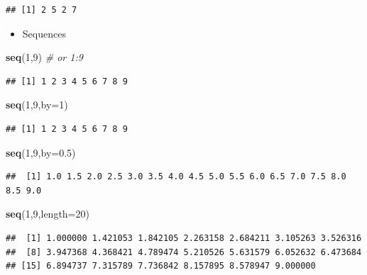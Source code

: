 \documentclass[]{article}
\def\tightlist{}
\newenvironment{Shaded}{\begin{snugshade}}{\end{snugshade}}
\newcommand{\KeywordTok}[1]{\textcolor[rgb]{0.13,0.29,0.53}{\textbf{{#1}}}}
\newcommand{\DataTypeTok}[1]{\textcolor[rgb]{0.13,0.29,0.53}{{#1}}}
\newcommand{\DecValTok}[1]{\textcolor[rgb]{0.00,0.00,0.81}{{#1}}}
\newcommand{\FloatTok}[1]{\textcolor[rgb]{0.00,0.00,0.81}{{#1}}}
\newcommand{\CommentTok}[1]{\textcolor[rgb]{0.56,0.35,0.01}{\textit{{#1}}}}
\newcommand{\NormalTok}[1]{{#1}}
\numberwithin{equation}{section}
\begin{document}
\begin{verbatim}
## [1] 2 5 2 7
\end{verbatim}

\begin{itemize}
\tightlist
\item
  Sequences
\end{itemize}

\begin{Shaded}
\begin{Highlighting}[]
\KeywordTok{seq}\NormalTok{(}\DecValTok{1}\NormalTok{,}\DecValTok{9}\NormalTok{) }\CommentTok{# or 1:9}
\end{Highlighting}
\end{Shaded}

\begin{verbatim}
## [1] 1 2 3 4 5 6 7 8 9
\end{verbatim}

\begin{Shaded}
\begin{Highlighting}[]
\KeywordTok{seq}\NormalTok{(}\DecValTok{1}\NormalTok{,}\DecValTok{9}\NormalTok{,}\DataTypeTok{by=}\DecValTok{1}\NormalTok{)}
\end{Highlighting}
\end{Shaded}

\begin{verbatim}
## [1] 1 2 3 4 5 6 7 8 9
\end{verbatim}

\begin{Shaded}
\begin{Highlighting}[]
\KeywordTok{seq}\NormalTok{(}\DecValTok{1}\NormalTok{,}\DecValTok{9}\NormalTok{,}\DataTypeTok{by=}\FloatTok{0.5}\NormalTok{)}
\end{Highlighting}
\end{Shaded}

\begin{verbatim}
##  [1] 1.0 1.5 2.0 2.5 3.0 3.5 4.0 4.5 5.0 5.5 6.0 6.5 7.0 7.5 8.0 8.5 9.0
\end{verbatim}

\begin{Shaded}
\begin{Highlighting}[]
\KeywordTok{seq}\NormalTok{(}\DecValTok{1}\NormalTok{,}\DecValTok{9}\NormalTok{,}\DataTypeTok{length=}\DecValTok{20}\NormalTok{)}
\end{Highlighting}
\end{Shaded}

\begin{verbatim}
##  [1] 1.000000 1.421053 1.842105 2.263158 2.684211 3.105263 3.526316
##  [8] 3.947368 4.368421 4.789474 5.210526 5.631579 6.052632 6.473684
## [15] 6.894737 7.315789 7.736842 8.157895 8.578947 9.000000
\end{verbatim}
\end{document}
